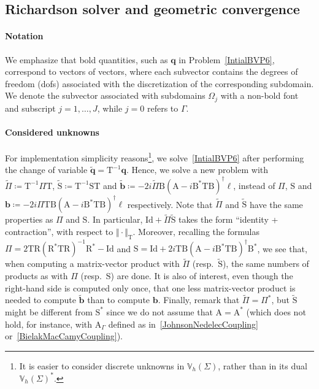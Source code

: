 \documentclass[a4paper,11pt]{article}
\newcommand{\mA}{\mathrm{A}}
\newcommand{\mB}{\mathrm{B}}
\newcommand{\Id}{\mathrm{Id}}
\newcommand{\mT}{\mathrm{T}}
\newcommand{\mS}{\mathrm{S}}
\newcommand{\mR}{\mathrm{R}}
\newcommand{\mbV}{\mathbb{V}}
\newcommand{\bell}{\boldsymbol{\ell}}
\newcommand{\bq}{\boldsymbol{q}}
\newcommand{\bb}{\boldsymbol{b}}
\begin{document}
\subsection{Richardson solver and geometric convergence}\label{subsec:main_algo}

\paragraph{Notation} We emphasize that bold quantities, such as \(\bq\) in Problem~\eqref{IntialBVP6}, correspond to vectors of vectors, where each subvector contains the degrees of freedom (dofs) associated with the discretization of the corresponding subdomain. We denote the subvector associated with subdomains \(\Omega_j\) with a non-bold font and subscript \(j=1,\dots,J\), while \(j=0\) refers to \(\Gamma\). 

\paragraph{Considered unknowns} For implementation simplicity reasons\footnote{It is easier to consider discrete unknowns in \(\mbV_h(\Sigma)\), rather than in its dual \(\mbV_h(\Sigma)^*\).}, we solve~\eqref{IntialBVP6} after performing the change of variable \( \tilde{\bq} = \mT^{-1} \bq\). Hence, we solve a new problem with \(\tilde{\Pi} \coloneqq \mT^{-1} \Pi \mT\), \(\tilde{\mS} \coloneqq \mT^{-1} \mS \mT\) and \(\tilde{\bb} \coloneqq -2i\tilde{\Pi}\mB(\mA-i\mB^*\mT\mB)^{\dagger}\bell\), instead of \(\Pi\), \(\mS\) and \(\bb \coloneqq -2i\Pi \mT \mB(\mA-i\mB^*\mT\mB)^{\dagger}\bell\) respectively.
Note that \(\tilde{\Pi}\) and \(\tilde{\mS}\) have the same properties as \(\Pi\) and \(\mS\). In particular, \(\Id + \tilde{\Pi} \tilde{\mS}\) takes the form ``identity + contraction'', with respect to \(\Vert \cdot \Vert_{\mT}\).
Moreover, recalling the formulas \(\Pi = 2\mT\mR (\mR^*\mT\mR)^{-1}\mR^*-\Id\) and \(\mS = \Id
  +2i\mT\mB(\mA-i\mB^*\mT\mB)^{\dagger}\mB^*\), we see that, when computing a matrix-vector product with \(\tilde{\Pi}\) (resp.~\(\tilde{\mS}\)), the same numbers of products as with \(\Pi\) (resp.~\(\mS\)) are done. 
It is also of interest, even though the right-hand side is computed only once, that one less matrix-vector product is needed to compute \(\tilde{\bb}\) than to compute \(\bb\). Finally, remark that \(\tilde{\Pi} = \Pi^*\), but \(\tilde{\mS}\) might be different from \(\mS^*\) since we do not assume that \(\mA = \mA^*\) (which does not hold, for instance, with \(\mA_{\Gamma}\) defined as in~\eqref{JohnsonNedelecCoupling} or~\eqref{BielakMacCamyCoupling}).
\end{document}
